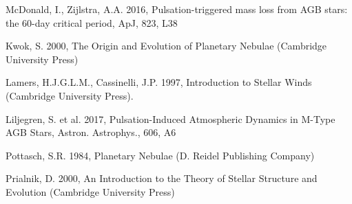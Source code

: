 \documentclass[a4paper,11pt]{article}
\begin{document}
\begin{thebibliography}{9}

    McDonald, I., Zijlstra, A.A. 2016, Pulsation-triggered mass loss from AGB stars: the 60-day critical period, ApJ, 823, L38 




    Kwok, S. 2000, The Origin and Evolution of Planetary Nebulae (Cambridge University Press)


    Lamers, H.J.G.L.M., Cassinelli, J.P. 1997, Introduction to Stellar Winds (Cambridge University Press). 

    Liljegren, S. et al. 2017, Pulsation-Induced Atmospheric Dynamics in M-Type AGB Stars, Astron. Astrophys., 606, A6 


    Pottasch, S.R. 1984, Planetary Nebulae (D. Reidel Publishing Company)

    Prialnik, D. 2000, An Introduction to the Theory of Stellar Structure and Evolution (Cambridge University Press)


\end{thebibliography}
\end{document}
